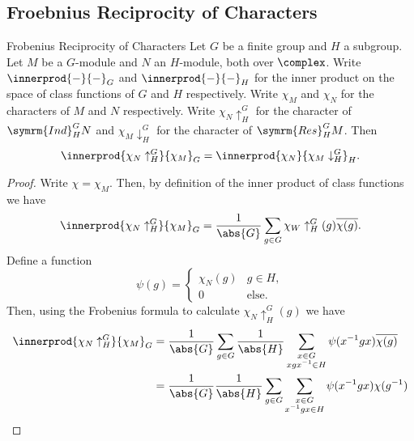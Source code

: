 \documentclass[fleqn]{NotesClass}
\newcommand{\Res}{\symrm{Res}}
\newcommand{\Ind}{\symrm{Ind}}
\begin{document}
    \subsection{Froebnius Reciprocity of Characters}
    \begin{thm}{Frobenius Reciprocity of Characters}{}
        Let \(G\) be a finite group and \(H\) a subgroup.
        Let \(M\) be a \(G\)-module and \(N\) an \(H\)-module, both over \(\complex\).
        Write \(\innerprod{-}{-}_G\) and \(\innerprod{-}{-}_H\) for the inner product on the space of class functions of \(G\) and \(H\) respectively.
        Write \(\chi_M\) and \(\chi_N\) for the characters of \(M\) and \(N\) respectively.
        Write \(\chi_N\uparrow^G_H\) for the character of \(\Ind^G_HN\) and \(\chi_M\downarrow^G_H\) for the character of \(\Res^G_HM\).
        Then
        \begin{equation}
            \innerprod{\chi_N\uparrow^G_H}{\chi_M}_G = \innerprod{\chi_N}{\chi_M\downarrow^G_H}_H.
        \end{equation}
        \begin{proof}
            Write \(\chi = \chi_M\).
            Then, by definition of the inner product of class functions we have
            \begin{equation}
                \innerprod{\chi_N\uparrow^G_H}{\chi_M}_G = \frac{1}{\abs{G}} \sum_{g \in G} \chi_W\uparrow^G_H(g) \overline{\chi(g)}.
            \end{equation}
            Define a function
            \begin{equation}
                \psi(g) = 
                \begin{cases}
                    \chi_N(g) & g \in H,\\
                    0 & \text{else}.
                \end{cases}
            \end{equation}
            Then, using the Frobenius formula to calculate \(\chi_N\uparrow^G_H(g)\) we have
            \begin{align}
                \innerprod{\chi_N\uparrow^G_H}{\chi_M}_G &= \frac{1}{\abs{G}} \sum_{g \in G} \frac{1}{\abs{H}} \sum_{\substack{x \in G\\ xgx^{-1} \in H}} \psi(x^{-1}gx) \overline{\chi(g)}\\
                &= \frac{1}{\abs{G}} \frac{1}{\abs{H}} \sum_{g \in G} \sum_{\substack{x \in G\\ x^{-1}gx \in H}} \psi(x^{-1}gx) \chi(g^{-1})
            \end{align}

\end{proof}
\end{thm}
\end{document}
